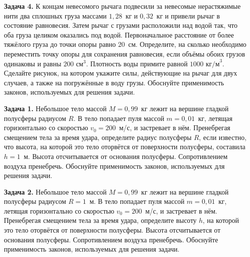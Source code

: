 \begin{taskbasic}[code={\label{task:mechanics_v6_n26}}]
\textbf{Задача 4.} К концам невесомого рычага подвесили за невесомые нерастяжимые нити два сплошных груза массами $1{,}28$~кг и $0{,}32$~кг и привели рычаг в состояние равновесия. Затем рычаг с грузами расположили над водой так, что оба груза целиком оказались под водой. Первоначальное расстояние от более тяжёлого груза до точки опоры равно $20$~см. Определите, на сколько необходимо переместить точку опоры для сохранения равновесия, если объёмы обоих грузов одинаковы и равны $200\text{ см}^3$. Плотность воды примите равной $1000\text{ кг/м}^3$. Сделайте рисунок, на котором укажите силы, действующие на рычаг для двух случаев, а также на погружённые в воду грузы. Обоснуйте применимость законов, используемых для решения задачи.

\end{taskbasic}


\begin{taskbasic}[code={\label{task:mechanics_v7_n26}}]
\textbf{Задача 1.} Небольшое тело массой $M = 0{,}99$~кг лежит на вершине гладкой полусферы радиусом $R$. В тело попадает пуля массой $m = 0{,}01$~кг, летящая горизонтально со скоростью $v_0 = 200$~м/с, и застревает в нём. Пренебрегая смещением тела за время удара, определите радиус полусферы $R$, если известно, что высота, на которой это тело оторвётся от поверхности полусферы, составила $h = 1$~м. Высота отсчитывается от основания полусферы. Сопротивлением воздуха пренебречь. Обоснуйте применимость законов, используемых для решения задачи.

\end{taskbasic}

\begin{taskbasic}[code={\label{task:mechanics_v8_n26}}]
\textbf{Задача 2.} Небольшое тело массой $M = 0{,}99$~кг лежит на вершине гладкой полусферы радиусом $R = 1$~м. В тело попадает пуля массой $m = 0{,}01$~кг, летящая горизонтально со скоростью $v_0 = 200$~м/с, и застревает в нём. Пренебрегая смещением тела за время удара, определите высоту $h$, на которой это тело оторвётся от поверхности полусферы. Высота отсчитывается от основания полусферы. Сопротивлением воздуха пренебречь. Обоснуйте применимость законов, используемых для решения задачи.

\end{taskbasic}

